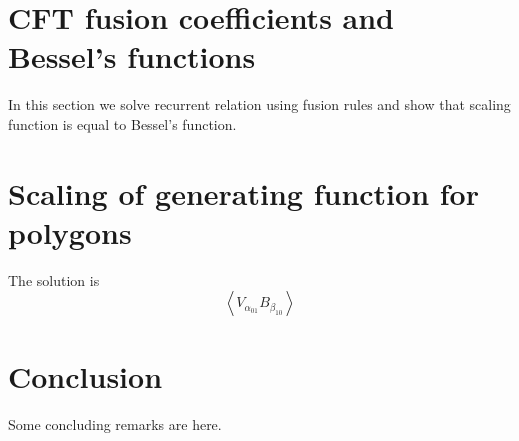 \documentclass[12pt]{article}
\begin{document}
\section{CFT fusion coefficients and Bessel's functions}
\label{sec:cft-fusi-coeff}

In this section we solve recurrent relation using fusion rules and
show that scaling function is equal to Bessel's function. 

\section{Scaling of generating function for polygons}
\label{sec:scal-gener-funct}

The solution is
\begin{equation}
  \label{eq:105}
  \left< V_{\alpha_{01}} B_{\beta_{10}}\right>
\end{equation}

\section{Conclusion}
\label{sec:conclusion}
Some concluding remarks are here. 

{} 

\end{document}
